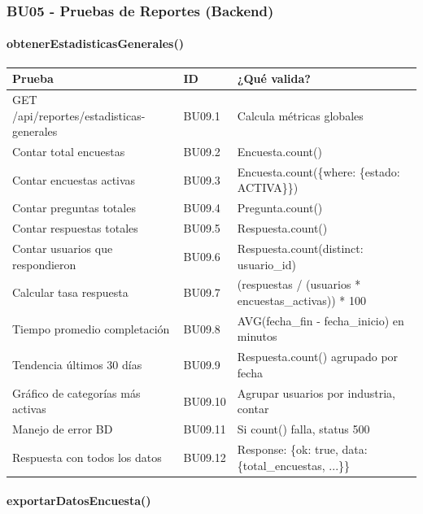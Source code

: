 \subsubsection{BU05 - Pruebas de Reportes (Backend)}

\paragraph{obtenerEstadisticasGenerales()}

\begin{table}[H]
\centering
\begin{tabular}{|l|l|p{6cm}|}
\hline
\textbf{Prueba} & \textbf{ID} & \textbf{¿Qué valida?} \\ \hline
GET /api/reportes/estadisticas-generales & BU09.1 & Calcula métricas globales \\ \hline
Contar total encuestas & BU09.2 & Encuesta.count() \\ \hline
Contar encuestas activas & BU09.3 & Encuesta.count(\{where: \{estado: ACTIVA\}\}) \\ \hline
Contar preguntas totales & BU09.4 & Pregunta.count() \\ \hline
Contar respuestas totales & BU09.5 & Respuesta.count() \\ \hline
Contar usuarios que respondieron & BU09.6 & Respuesta.count(distinct: usuario\_id) \\ \hline
Calcular tasa respuesta & BU09.7 & (respuestas / (usuarios * encuestas\_activas)) * 100 \\ \hline
Tiempo promedio completación & BU09.8 & AVG(fecha\_fin - fecha\_inicio) en minutos \\ \hline
Tendencia últimos 30 días & BU09.9 & Respuesta.count() agrupado por fecha \\ \hline
Gráfico de categorías más activas & BU09.10 & Agrupar usuarios por industria, contar \\ \hline
Manejo de error BD & BU09.11 & Si count() falla, status 500 \\ \hline
Respuesta con todos los datos & BU09.12 & Response: \{ok: true, data: \{total\_encuestas, ...\}\} \\ \hline
\end{tabular}
\end{table}

\paragraph{exportarDatosEncuesta()}

